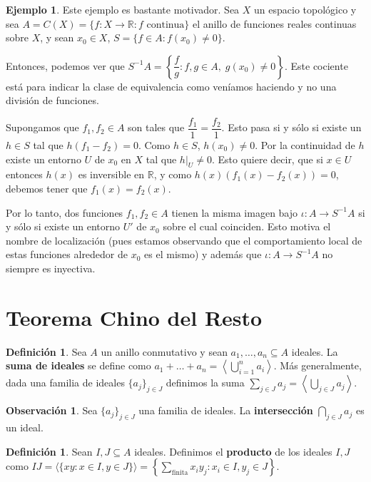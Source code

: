 \documentclass[12pt]{book}
\theoremstyle{definition}
\newtheorem{obs}[teo]{Observación}
\newtheorem{defn}[teo]{Definición}
\newtheorem{ex}[teo]{Ejemplo}
\newcommand{\RR}{\mathbb{R}}      %
\begin{document}
\begin{ex}
Este ejemplo es bastante motivador. Sea $X$ un espacio topológico y sea $A=C(X) = \{f:X\to\RR : f\text{ continua}\}$ el anillo de funciones reales continuas sobre $X$, y sean $x_0\in X$, $S= \{f\in A : f(x_0)\neq 0\}$.

Entonces, podemos ver que $S^{-1}A = \left\{\dfrac{f}{g} : f,g\in A,\; g(x_0)\neq 0\right\}$. Este cociente está para indicar la clase de equivalencia como veníamos haciendo y no una división de funciones.

Supongamos que $f_1,f_2\in A$ son tales que $\dfrac{f_1}{1}=\dfrac{f_2}{1}$. Esto pasa si y sólo si existe un $h\in S$ tal que $h(f_1-f_2)=0$. Como $h\in S$, $h(x_0)\neq 0$. Por la continuidad de $h$ existe un entorno $U$ de $x_0$ en $X$ tal que $\left. h \right|_{U}\neq 0$. Esto quiere decir, que si $x\in U$ entonces $h(x)$ es inversible en $\RR$, y como $h(x)(f_1(x)-f_2(x)) = 0$, debemos tener que $f_1(x)=f_2(x)$.

Por lo tanto, dos funciones $f_1,f_2\in A$ tienen la misma imagen bajo $\iota: A\to S^{-1}A$ si y sólo si existe un entorno $U'$ de $x_0$ sobre el cual coinciden. Esto motiva el nombre de localización (pues estamos observando que el comportamiento local de estas funciones alrededor de $x_0$ es el mismo) y además que $\iota : A\to S^{-1}A$ no siempre es inyectiva.

\end{ex}

\section{Teorema Chino del Resto}

\begin{defn}

Sea $A$ un anillo conmutativo y sean $a_1,\ldots ,a_n\subseteq A$ ideales. La \textbf{suma de ideales} se define como $a_1+\ldots + a_n = \left\langle\displaystyle\bigcup_{i=1}^{n} a_i \right\rangle$. Más generalmente, dada una familia de ideales $\{a_j\}_{j\in J}$ definimos la suma $\displaystyle\sum_{j\in J}a_j = \left\langle \bigcup_{j\in J} a_j \right\rangle$.
\end{defn}
\begin{obs}
Sea $\{a_j\}_{j\in J}$ una familia de ideales. La \textbf{intersección} $\displaystyle\bigcap_{j\in J}a_j$ es un ideal.
\end{obs}
\begin{defn}
Sean $I,J\subseteq A$ ideales. Definimos el \textbf{producto} de los ideales $I,J$ como $IJ = \langle \{xy : x\in I, y\in J\}\rangle = \left\{ \displaystyle\sum_{\text{finita}} x_iy_j : x_i\in I, y_j\in J \right\}$.

\end{defn}
\end{document}
